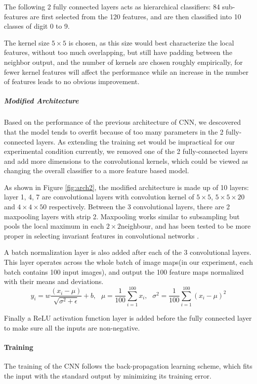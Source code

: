 \documentclass[12pt]{article}
\begin{document}
The following 2 fully connected layers acts as hierarchical classifiers: 84 sub-features are first selected from the 120 features, and are then classified into 10 classes of digit 0 to 9.

The kernel size  $5\times 5$ is chosen, as this size would best characterize the local features, without too much overlapping, but still have padding between the neighbor output, and the number of kernels are chosen roughly empirically, for fewer kernel features will affect the performance while  an increase in the number of features leads to no obvious improvement. 

\subparagraph {Modified Architecture}
Based on the performance of the previous architecture of CNN, we descovered that the model tends to overfit because of too many parameters in the 2 fully-connected layers. As extending the training set would be impractical for our experimental condition currently, we removed one of the 2 fully-connected layers and add more dimensions to the convolutional kernels, which could be viewed as changing the overall classifier to a more feature based model.

As shown in Figure \ref{fig:arch2}, the modified architecture is made up of 10 layers: layer 1, 4, 7 are convolutional layers with convolution kernel of $5\times5$, $5\times5\times20$ and $4\times4\times50$ respectively. Between the 3 convolutional layers, there are 2 maxpooling layers with strip 2. Maxpooling works similar to subsampling but pools the local maximum in each $2\times 2$neighbour, and has been tested to be more proper in selecting invariant features in convolutional networks \cite{cherer2010evaluation}.  

A batch normalization\cite{vedaldi15matconvnet} layer is also added after each of the 3 convolutional layers. This layer operates across the whole batch of image maps(in our experiment, each batch contains 100 input images), and output the 100 feature maps normalized with their means and deviations.
$$y_i = w\frac{(x_i-\mu)}{\sqrt{\sigma^2+\epsilon}}+b,\ \ \ \mu = \frac{1}{100}\sum_{i =1}^{100}x_i,\ \ \ \sigma^2 = \frac{1}{100}\sum_{i =1}^{100}(x_i-\mu)^2$$

Finally a ReLU activation function layer is added before the fully connected layer to make sure all the inputs are non-negative.
\paragraph{Training}

The training of the CNN follows the back-propagation learning scheme\cite{lecun1989backpropagation}, which fits the input with the standard output by minimizing its training error.
\end{document}
